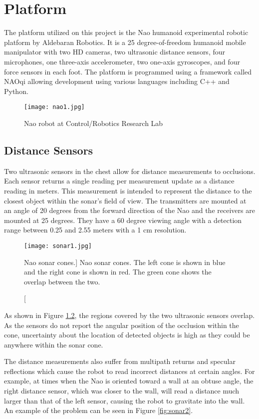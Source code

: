 \chapter{Platform}

The platform utilized on this project is the Nao humanoid experimental robotic platform by Aldebaran Robotics. It is a 25 degree-of-freedom humanoid mobile manipulator with two HD cameras, two ultrasonic distance sensors, four microphones, one three-axis accelerometer, two one-axis gyroscopes, and four force sensors in each foot. The platform is programmed using a framework called NAOqi allowing development using various languages including C++ and Python. 

\begin{figure}[h]
	\centering
	\texttt{[image: nao1.jpg]}
	\caption
	{Nao robot at Control/Robotics Research Lab}
	\label{fig:nao1}
\end{figure}

\section{Distance Sensors}\label{sec:sonar_section}
Two ultrasonic sensors in the chest allow for distance measurements to occlusions. Each sensor returns a single reading per measurement update as a distance reading in meters. This measurement is intended to represent the distance to the closest object within the sonar's field of view.
The transmitters are mounted at an angle of 20 degrees from the forward direction of the Nao and the receivers are mounted at 25 degrees. They have a 60 degree viewing angle with a detection range between 0.25 and 2.55 meters with a 1 cm resolution. 

\begin{figure}[h]
	\centering
	\texttt{[image: sonar1.jpg]}
	\caption
	[Nao sonar cones.]
	{Nao sonar cones. The left cone is shown in blue and the right cone is shown in red. The green cone shows the overlap between the two.}
	\label{fig:sonar1}
\end{figure}

As shown in Figure \ref{fig:sonar1}, the regions covered by the two ultrasonic sensors overlap. As the sensors do not report the angular position of the occlusion within the cone, uncertainty about the location of detected objects is high as they could be anywhere within the sonar cone.

The distance measurements also suffer from multipath returns and specular reflections which cause the robot to read incorrect distances at certain angles. For example, at times when the Nao is oriented toward a wall at an obtuse angle, the right distance sensor, which was closer to the wall, will read a distance much larger than that of the left sensor, causing the robot to gravitate into the wall. An example of the problem can be seen in Figure \ref{fig:sonar2}.

